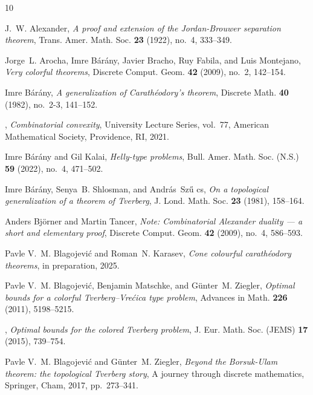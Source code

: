 \documentclass[a4paper,11pt,reqno, english]{amsart}
\theoremstyle{definition}
\theoremstyle{remark}
\begin{document}
\providecommand{\href}[2]{#2}
\begin{thebibliography}{10}

J.~W. Alexander, \emph{A proof and extension of the {J}ordan-{B}rouwer
  separation theorem}, Trans. Amer. Math. Soc. \textbf{23} (1922), no.~4,
  333--349.

Jorge~L. Arocha, Imre B\'ar\'any, Javier Bracho, Ruy Fabila, and Luis
  Montejano, \emph{Very colorful theorems}, Discrete Comput. Geom. \textbf{42}
  (2009), no.~2, 142--154.

Imre B\'ar\'any, \emph{A generalization of {C}arath\'eodory's theorem},
  Discrete Math. \textbf{40} (1982), no.~2-3, 141--152.

\bysame, \emph{Combinatorial convexity}, University Lecture Series, vol.~77,
  American Mathematical Society, Providence, RI, 2021.

Imre B\'ar\'any and Gil Kalai, \emph{Helly-type problems}, Bull. Amer. Math.
  Soc. (N.S.) \textbf{59} (2022), no.~4, 471--502.

Imre B{\'a}r{\'a}ny, Senya~B. Shlosman, and Andr{\'a}s~Sz{\H{u}} cs, \emph{On a
  topological generalization of a theorem of {T}verberg}, J. Lond. Math. Soc.
  \textbf{23} (1981), 158--164.

Anders Bj\"{o}rner and Martin Tancer, \emph{Note: {C}ombinatorial {A}lexander
  duality --- a short and elementary proof}, Discrete Comput. Geom. \textbf{42}
  (2009), no.~4, 586--593.

Pavle V.~M. Blagojevi\'{c} and Roman~N. Karasev, \emph{Cone colourful
  carath\'eodory theorems}, in preparation, 2025.

Pavle V.~M. Blagojevi\'c, Benjamin Matschke, and G\"unter~M. Ziegler,
  \emph{Optimal bounds for a colorful {T}verberg--{V}re\'cica type problem},
  Advances in Math. \textbf{226} (2011), 5198--5215.

\bysame, \emph{Optimal bounds for the colored {T}verberg problem}, J. Eur.
  Math. Soc. (JEMS) \textbf{17} (2015), 739--754.

Pavle V.~M. Blagojevi\'{c} and G\"{u}nter~M. Ziegler, \emph{Beyond the
  {B}orsuk-{U}lam theorem: the topological {T}verberg story}, A journey through
  discrete mathematics, Springer, Cham, 2017, pp.~273--341.


\end{thebibliography}
\end{document}
